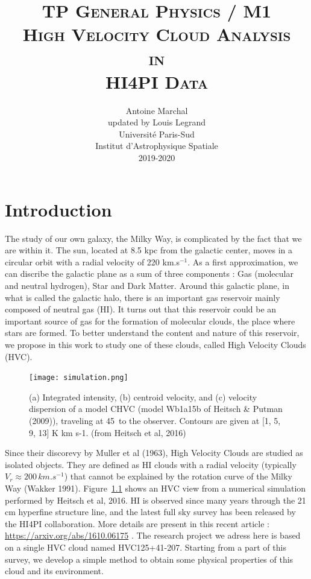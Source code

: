 \documentclass[a4paper,10.5pt]{report}
\title{{\textsc{\Large{TP General Physics / M1}\\ [3cm]
      \textbf{\LARGE{High Velocity Cloud Analysis \\ in \\ HI4PI Data}}}} \\[2cm]}
\author{Antoine Marchal \\
 updated by Louis Legrand \\ [1cm]
Université Paris-Sud \\
Institut d’Astrophysique Spatiale \\
2019-2020}
\date{}
\begin{document}
\begin{titlingpage}
\maketitle
\end{titlingpage}
\newpage

\newpage
\chapter{Introduction}
The study of our own galaxy, the Milky Way, is complicated by the fact that we are within it.
The sun, located at 8.5 kpc from the galactic center, moves in a circular orbit with a radial velocity of
220 km.s$^{-1}$.
As a first approximation, we can discribe the galactic plane as a sum of three components : Gas (molecular and neutral hydrogen), Star
and Dark Matter. Around this galactic plane, in what is called the galactic halo, there is an important gas reservoir mainly composed of neutral gas (HI).
It turns out that this reservoir could be an important source of gas for the formation of molecular clouds, the place where stars are formed.
To better understand the content and nature of this reservoir, we propose in this work to study one of these clouds, called High Velocity Clouds (HVC).

\begin{figure}[h!]
  \centering
  \texttt{[image: simulation.png]}
  \label{fig::simulation}
  \caption{(a) Integrated intensity, (b) centroid velocity, and (c) velocity dispersion of a model CHVC (model Wb1a15b of
    Heitsch \& Putman (2009)), traveling at 45\,\degree{} to the observer. Contours are given at [1, 5, 9, 13] K km s-1.
    (from Heitsch et al, 2016)}
\end{figure}

Since their discorevy by Muller et al (1963), High Velocity Clouds are studied as isolated objects. They are defined
as HI clouds with a radial velocity (typically $ V_r \approx 200 \, km.s^{-1}$) that cannot be explained by the rotation
curve of the Milky Way (Wakker 1991). Figure~\ref{fig::simulation} shows an HVC view from a numerical simulation performed by
Heitsch et al, 2016. HI is observed since many years through the 21 cm hyperfine structure line, and the latest full sky survey
has been released by the HI4PI collaboration. More details are present in this recent article :
\color{blue} \url{https://arxiv.org/abs/1610.06175} \color{black}.
The research project we adress here is based on a single HVC cloud named HVC125+41-207.
Starting from a part of this survey, we develop a simple method to obtain some physical properties of this cloud
and its environment. \\
\end{document}
